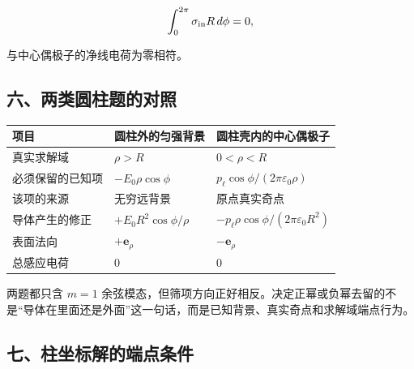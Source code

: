 \[
\int_0^{2\pi}\sigma_{\rm in}R\,d\phi=0,
\]

与中心偶极子的净线电荷为零相符。

\subsection{六、两类圆柱题的对照}\label{m2:ux516dux4e24ux7c7bux5706ux67f1ux9898ux7684ux5bf9ux7167}

{\def\LTcaptype{none} %
\begin{longtable}[]{@{}
  >{\raggedright\arraybackslash}p{}
  >{\raggedright\arraybackslash}p{}
  >{\raggedright\arraybackslash}p{}@{}}
\toprule\noalign{}
\begin{minipage}[b]{\linewidth}\raggedright
项目
\end{minipage} & \begin{minipage}[b]{\linewidth}\raggedright
圆柱外的匀强背景
\end{minipage} & \begin{minipage}[b]{\linewidth}\raggedright
圆柱壳内的中心偶极子
\end{minipage} \\
\midrule\noalign{}
\endhead
\bottomrule\noalign{}
\endlastfoot
真实求解域 & \(\rho>R\) & \(0<\rho<R\) \\
必须保留的已知项 & \(-E_0\rho\cos\phi\) &
\(p_{\ell}\cos\phi/(2\pi\varepsilon_0\rho)\) \\
该项的来源 & 无穷远背景 & 原点真实奇点 \\
导体产生的修正 & \(+E_0R^2\cos\phi/\rho\) &
\(-p_{\ell}\rho\cos\phi/(2\pi\varepsilon_0R^2)\) \\
表面法向 & \(+\mathbf e_{\rho}\) & \(-\mathbf e_{\rho}\) \\
总感应电荷 & \(0\) & \(0\) \\
\end{longtable}
}

两题都只含 \(m=1\)
余弦模态，但筛项方向正好相反。决定正幂或负幂去留的不是``导体在里面还是外面''这一句话，而是已知背景、真实奇点和求解域端点行为。

\subsection{七、柱坐标解的端点条件}\label{m2:ux4e03ux67f1ux5750ux6807ux89e3ux7684ux7aefux70b9ux6761ux4ef6}

